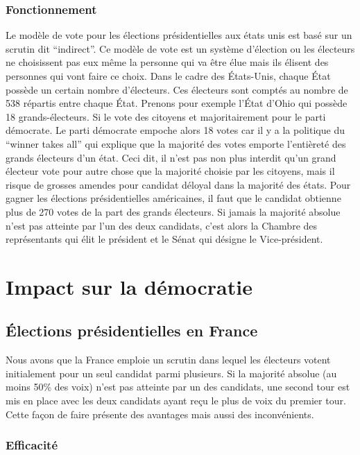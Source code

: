 \documentclass[11pt,a4paper]{report}
\begin{document}
\subsection{Fonctionnement} %
Le modèle de vote pour les élections présidentielles aux états unis est basé sur un scrutin dit “indirect”.
Ce modèle de vote est un système d'élection ou les électeurs ne choisissent pas eux même la personne qui va être élue mais ils élisent des personnes qui vont faire ce choix.
Dans le cadre des États-Unis, chaque État possède un certain nombre d'électeurs.
Ces électeurs sont comptés au nombre de 538 répartis entre chaque État.
Prenons pour exemple l'État d'Ohio qui possède 18 grands-électeurs.
Si le vote des citoyens et majoritairement pour le parti démocrate.
Le parti démocrate empoche alors 18 votes car il y a la politique du “winner takes all” qui explique que la majorité des votes emporte l'entièreté des grands électeurs d’un état.
Ceci dit, il n’est pas non plus interdit qu’un grand électeur vote pour autre chose que la majorité choisie par les citoyens, mais il risque de grosses amendes pour candidat déloyal dans la majorité des états.
Pour gagner les élections présidentielles américaines, il faut que le candidat obtienne plus de 270 votes de la part des grands électeurs.
Si jamais la majorité absolue n’est pas atteinte par l’un des deux candidats, c’est alors la Chambre des représentants qui élit le président et le Sénat qui désigne le Vice-président.
\nocite{wiki:electday}
\nocite{wiki:elecus}
\nocite{wiki:eleccoll}

\chapter{Impact sur la démocratie}

\section{Élections présidentielles en France}
Nous avons que la France emploie un scrutin dans lequel les électeurs votent initialement pour un seul candidat parmi plusieurs.
Si la majorité absolue (au moins 50\% des voix) n’est pas atteinte par un des candidats, une second tour est mis en place avec les deux candidats ayant reçu le plus de voix du premier tour.\nocite{wiki:scrutinuni2tours}
Cette façon de faire présente des avantages mais aussi des inconvénients.

\subsection{Efficacité}
\end{document}
